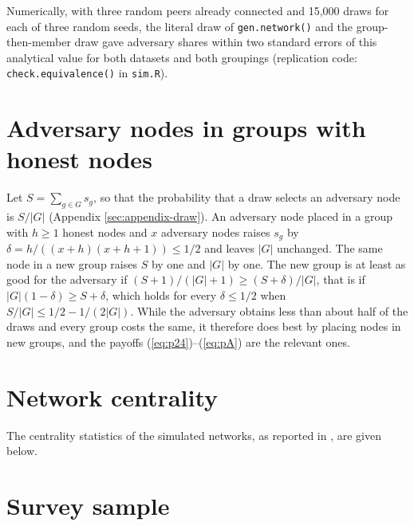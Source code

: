 \documentclass[english]{mrl}
\theoremstyle{plain}
\begin{document}
Numerically, with three random peers already connected and 15,000 draws for each of three random seeds, the literal draw of \texttt{gen.network()} and the group-then-member draw gave adversary shares within two standard errors of this analytical value for both datasets and both groupings (replication code: \texttt{check.equivalence()} in \texttt{sim.R}).

\section{Adversary nodes in groups with honest nodes\label{sec:appendix-shared}}

Let $S=\sum_{g\in G}s_{g}$, so that the probability that a draw selects an adversary node is $S/|G|$ (Appendix \ref{sec:appendix-draw}). An adversary node placed in a group with $h \ge 1$ honest nodes and $x$ adversary nodes raises $s_{g}$ by $\delta = h/((x+h)(x+h+1)) \le 1/2$ and leaves $|G|$ unchanged. The same node in a new group raises $S$ by one and $|G|$ by one. The new group is at least as good for the adversary if $(S+1)/(|G|+1) \ge (S+\delta)/|G|$, that is if $|G|(1-\delta) \ge S+\delta$, which holds for every $\delta \le 1/2$ when $S/|G| \le 1/2 - 1/(2|G|)$. While the adversary obtains less than about half of the draws and every group costs the same, it therefore does best by placing nodes in new groups, and the payoffs (\ref{eq:p24})--(\ref{eq:pA}) are the relevant ones.

\section{Network centrality\label{sec:appendix-centrality}}

The centrality statistics of the simulated networks, as reported in \cite{Rucknium2025}, are given below.



\section{Survey sample\label{sec:appendix-survey}}


\end{document}
